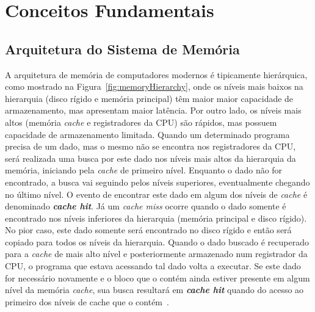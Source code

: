 \chapter{Conceitos Fundamentais}
\label{cap:conceitos_fundamentais}

\section{Arquitetura do Sistema de Memória}
\label{sec:conceitosFundamentaisArquitetura}

A arquitetura de memória de computadores modernos é tipicamente hierárquica, como mostrado na Figura~\ref{fig:memoryHierarchy}, onde os níveis mais baixos na hierarquia (disco rígido e memória principal) têm maior maior capacidade de armazenamento, mas apresentam maior latência.
Por outro lado, os níveis mais altos (memória \textit{cache} e registradores da CPU) são rápidos, mas possuem capacidade de armazenamento limitada.
Quando um determinado programa precisa de um dado, mas o mesmo não se encontra nos registradores da CPU, será realizada uma busca por este dado nos níveis mais altos da hierarquia da memória, iniciando pela \textit{cache} de primeiro nível. Enquanto o dado não for encontrado, a busca vai seguindo pelos níveis superiores, eventualmente chegando no último nível.
O evento de encontrar este dado em algum dos níveis de \textit{cache} é denominado \textbf{\textit{cache hit}}.
Já um \textit{cache miss} ocorre quando o dado somente é  encontrado nos níveis inferiores da hierarquia (memória principal e disco rígido).
No pior caso, este dado somente será encontrado no disco rígido e então será copiado para todos os níveis da hierarquia.
Quando o dado buscado é recuperado para a \textit{cache} de mais alto nível e posteriormente armazenado num registrador da CPU, o programa que estava acessando tal dado volta a executar.
Se este dado for necessário novamente e o bloco que o contém ainda estiver presente em algum nível da memória \textit{cache}, sua busca resultará em \textbf{\textit{cache hit}} quando do acesso ao primeiro dos níveis de cache que o contém~\cite{patterson2013computer}.

